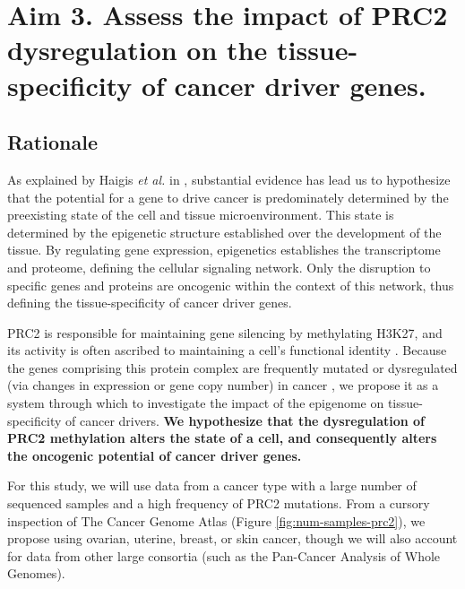 \section{Aim 3. Assess the impact of PRC2 dysregulation on the tissue-specificity of cancer driver genes.}

\subsection*{Rationale}

As explained by Haigis \emph{et al.} in \cite{Haigis2019}, substantial evidence has lead us to hypothesize that the potential for a gene to drive cancer is predominately determined by the preexisting state of the cell and tissue microenvironment.
This state is determined by the epigenetic structure established over the development of the tissue.
By regulating gene expression, epigenetics establishes the transcriptome and proteome, defining the cellular signaling network.
Only the disruption to specific genes and proteins are oncogenic within the context of this network, thus defining the tissue-specificity of cancer driver genes.

PRC2 is responsible for maintaining gene silencing by methylating H3K27, and its activity is often ascribed to maintaining a cell's functional identity \cite{Comet2016MaintainingCancer., Laugesen2019a}.
Because the genes comprising this protein complex are frequently mutated or dysregulated (via changes in expression or gene copy number) in cancer \cite{Wassef2017, Comet2016MaintainingCancer.}, we propose it as a system through which to investigate the impact of the epigenome on tissue-specificity of cancer drivers.
\textbf{We hypothesize that the dysregulation of PRC2 methylation alters the state of a cell, and consequently alters the oncogenic potential of cancer driver genes.}

For this study, we will use data from a cancer type with a large number of sequenced samples and a high frequency of PRC2 mutations.
From a cursory inspection of The Cancer Genome Atlas (Figure \ref{fig:num-samples-prc2}), we propose using ovarian, uterine, breast, or skin cancer, though we will also account for data from other large consortia (such as the Pan-Cancer Analysis of Whole Genomes).

